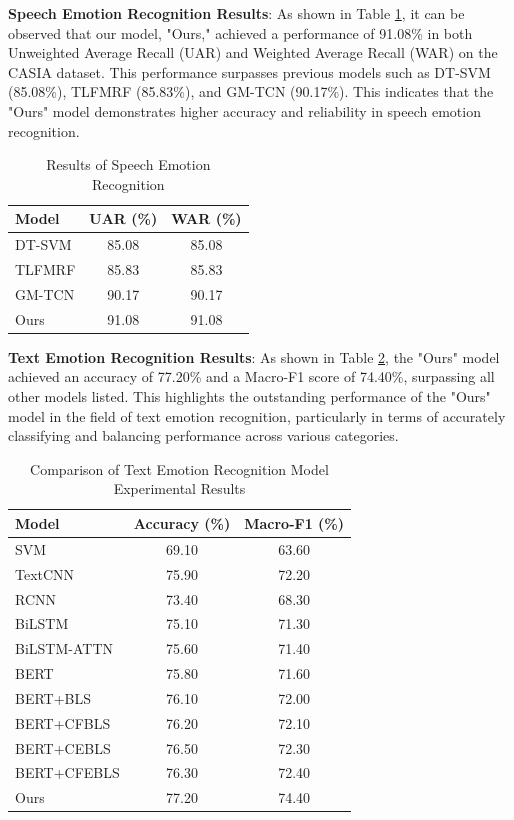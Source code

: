 \documentclass[preprint,12pt]{elsarticle}
\begin{document}
\textbf{Speech Emotion Recognition Results}: As shown in Table \ref{Table2}, it can be observed that our model, "Ours," achieved a performance of 91.08\% in both Unweighted Average Recall (UAR) and Weighted Average Recall (WAR) on the CASIA dataset. This performance surpasses previous models such as DT-SVM (85.08\%), TLFMRF (85.83\%), and GM-TCN (90.17\%). This indicates that the "Ours" model demonstrates higher accuracy and reliability in speech emotion recognition.
\begin{table}[ht]
\centering
\caption{Results of Speech Emotion Recognition}\label{Table2}
\begin{tabular}{lcc}
\hline
Model       & UAR (\%) & WAR (\%) \\
\hline
DT-SVM  & 85.08    & 85.08    \\
TLFMRF & 85.83    & 85.83    \\
GM-TCN& 90.17    & 90.17    \\
Ours          & 91.08    & 91.08    \\
\hline
\end{tabular}
\end{table}

\textbf{Text Emotion Recognition Results}: As shown in Table \ref{Table3}, the "Ours" model achieved an accuracy of 77.20\% and a Macro-F1 score of 74.40\%, surpassing all other models listed. This highlights the outstanding performance of the "Ours" model in the field of text emotion recognition, particularly in terms of accurately classifying and balancing performance across various categories.
\begin{table}[ht]
\centering
\caption{Comparison of Text Emotion Recognition Model Experimental Results}\label{Table3}
\begin{tabular}{lcc}
\hline
Model           & Accuracy (\%) & Macro-F1 (\%) \\
\hline
SVM             & 69.10         & 63.60         \\
TextCNN         & 75.90         & 72.20         \\
RCNN            & 73.40         & 68.30         \\
BiLSTM          & 75.10         & 71.30         \\
BiLSTM-ATTN     & 75.60         & 71.40         \\
BERT            & 75.80         & 71.60         \\
BERT+BLS        & 76.10         & 72.00         \\
BERT+CFBLS      & 76.20         & 72.10         \\
BERT+CEBLS      & 76.50         & 72.30         \\
BERT+CFEBLS     & 76.30         & 72.40         \\
Ours            & 77.20         & 74.40         \\
\hline
\end{tabular}
\end{table}
\end{document}

